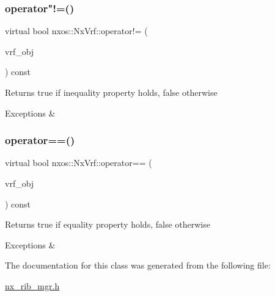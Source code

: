 \subsubsection{\texorpdfstring{operator"!=()}{operator!=()}}
{\footnotesize\ttfamily virtual bool nxos\+::\+Nx\+Vrf\+::operator!= (\begin{DoxyParamCaption}\item[{\mbox{\hyperlink{classnxos_1_1_nx_vrf}{Nx\+Vrf}} const \&}]{vrf\+\_\+obj }\end{DoxyParamCaption}) const\hspace{0.3cm}{\ttfamily [pure virtual]}}

\begin{DoxyReturn}{Returns}
true if inequality property holds, false otherwise
\end{DoxyReturn}

\begin{DoxyCode}
\end{DoxyCode}



\begin{DoxyExceptions}{Exceptions}
{\em } & \\
\hline
\end{DoxyExceptions}
\mbox{\label{classnxos_1_1_nx_vrf_adc5d2e97b5fceb4fab75c448fb54ada5}} 
\subsubsection{\texorpdfstring{operator==()}{operator==()}}
{\footnotesize\ttfamily virtual bool nxos\+::\+Nx\+Vrf\+::operator== (\begin{DoxyParamCaption}\item[{\mbox{\hyperlink{classnxos_1_1_nx_vrf}{Nx\+Vrf}} const \&}]{vrf\+\_\+obj }\end{DoxyParamCaption}) const\hspace{0.3cm}{\ttfamily [pure virtual]}}

\begin{DoxyReturn}{Returns}
true if equality property holds, false otherwise
\end{DoxyReturn}

\begin{DoxyCode}
\end{DoxyCode}



\begin{DoxyExceptions}{Exceptions}
{\em } & \\
\hline
\end{DoxyExceptions}


The documentation for this class was generated from the following file\+:\begin{DoxyCompactItemize}
\item 
\mbox{\hyperlink{nx__rib__mgr_8h}{nx\+\_\+rib\+\_\+mgr.\+h}}\end{DoxyCompactItemize}
